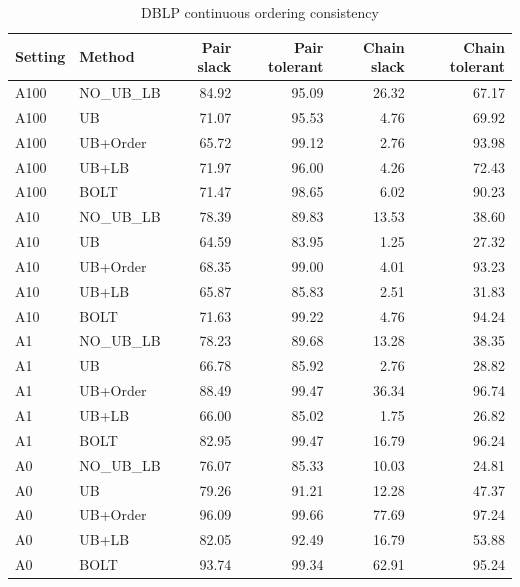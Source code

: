 \begin{table}[H]
\centering
\small
\setlength{\tabcolsep}{5pt}
\caption{DBLP continuous ordering consistency}
\label{tab:C_legacy_order_DBLP}
\begin{tabular}{@{}llrrrr@{}}
\toprule
Setting & Method & Pair slack & Pair tolerant & Chain slack & Chain tolerant \\
\midrule
A100 & NO\_UB_LB & 84.92 & 95.09 & 26.32 & 67.17 \\
A100 & UB & 71.07 & 95.53 & 4.76 & 69.92 \\
A100 & UB+Order & 65.72 & 99.12 & 2.76 & 93.98 \\
A100 & UB+LB & 71.97 & 96.00 & 4.26 & 72.43 \\
A100 & BOLT & 71.47 & 98.65 & 6.02 & 90.23 \\
A10 & NO\_UB_LB & 78.39 & 89.83 & 13.53 & 38.60 \\
A10 & UB & 64.59 & 83.95 & 1.25 & 27.32 \\
A10 & UB+Order & 68.35 & 99.00 & 4.01 & 93.23 \\
A10 & UB+LB & 65.87 & 85.83 & 2.51 & 31.83 \\
A10 & BOLT & 71.63 & 99.22 & 4.76 & 94.24 \\
A1 & NO\_UB_LB & 78.23 & 89.68 & 13.28 & 38.35 \\
A1 & UB & 66.78 & 85.92 & 2.76 & 28.82 \\
A1 & UB+Order & 88.49 & 99.47 & 36.34 & 96.74 \\
A1 & UB+LB & 66.00 & 85.02 & 1.75 & 26.82 \\
A1 & BOLT & 82.95 & 99.47 & 16.79 & 96.24 \\
A0 & NO\_UB_LB & 76.07 & 85.33 & 10.03 & 24.81 \\
A0 & UB & 79.26 & 91.21 & 12.28 & 47.37 \\
A0 & UB+Order & 96.09 & 99.66 & 77.69 & 97.24 \\
A0 & UB+LB & 82.05 & 92.49 & 16.79 & 53.88 \\
A0 & BOLT & 93.74 & 99.34 & 62.91 & 95.24 \\
\bottomrule
\end{tabular}
\end{table}
